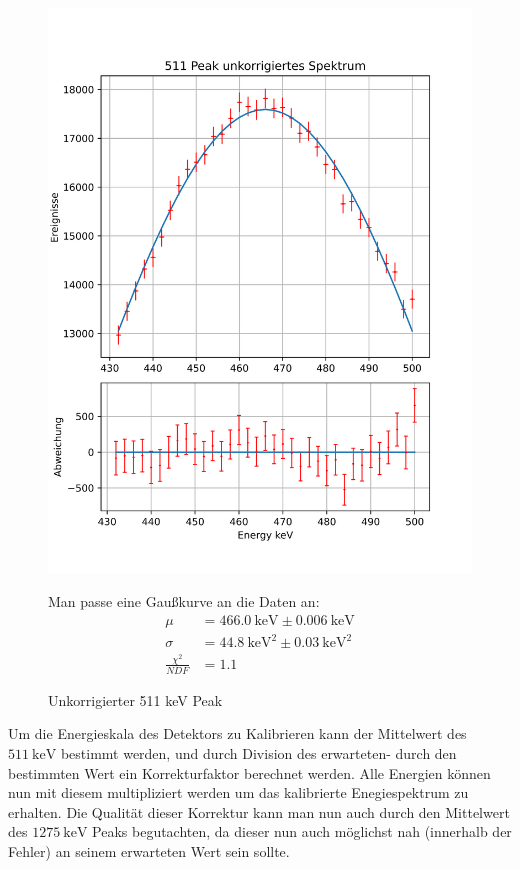 \documentclass[12pt,twoside,a4paper]{scrartcl}
\begin{document}
		\begin{figure}[H]
			\begin{minipage}{0.49 \textwidth}
				\includegraphics[width = \textwidth]{Plots/EnergyUnkorrigiert511 Peak.png}
				\caption{Unkorrigierter 511 keV Peak}
			\end{minipage}
			\begin{minipage}{0.49 \textwidth}
				Man passe eine Gaußkurve an die Daten an:
				\begin{align*}
					\mu &= \SI{466.0}{\kilo \electronvolt} \pm \SI{0.006}{\kilo \electronvolt} \\
					\sigma &= \SI{44.8}{\kilo \electronvolt \squared} \pm \SI{0.03}{\kilo \electronvolt \squared} \\
					\frac{\chi^2}{NDF} &= 1.1
				\end{align*}
			\end{minipage}
		\end{figure}

		Um die Energieskala des Detektors zu Kalibrieren kann der Mittelwert des $\SI{511}{\kilo \electronvolt}$ bestimmt werden, und durch Division des erwarteten- durch den bestimmten Wert ein Korrekturfaktor berechnet werden. Alle Energien können nun mit diesem multipliziert werden um das kalibrierte Enegiespektrum zu erhalten.
		Die Qualität dieser Korrektur kann man nun auch durch den Mittelwert des $\SI{1275}{\kilo \electronvolt}$ Peaks begutachten, da dieser nun auch möglichst nah (innerhalb der Fehler) an seinem erwarteten Wert sein sollte.
\end{document}
